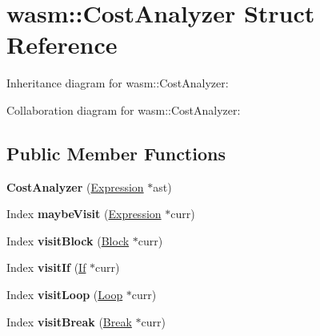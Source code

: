 \hypertarget{structwasm_1_1_cost_analyzer}{}\section{wasm\+:\+:Cost\+Analyzer Struct Reference}
\label{structwasm_1_1_cost_analyzer}


Inheritance diagram for wasm\+:\+:Cost\+Analyzer\+:


Collaboration diagram for wasm\+:\+:Cost\+Analyzer\+:
\subsection*{Public Member Functions}
\begin{DoxyCompactItemize}
\item 
\mbox{\label{structwasm_1_1_cost_analyzer_acbe33cdde382105fd6faff73ebd56bc3}} 
{\bfseries Cost\+Analyzer} (\mbox{\hyperlink{classwasm_1_1_expression}{Expression}} $\ast$ast)
\item 
\mbox{\label{structwasm_1_1_cost_analyzer_a6a0e0ae723398dc68a5b70b4667e8025}} 
Index {\bfseries maybe\+Visit} (\mbox{\hyperlink{classwasm_1_1_expression}{Expression}} $\ast$curr)
\item 
\mbox{\label{structwasm_1_1_cost_analyzer_ac576fca08a8882504945fc85fe2d72d6}} 
Index {\bfseries visit\+Block} (\mbox{\hyperlink{classwasm_1_1_block}{Block}} $\ast$curr)
\item 
\mbox{\label{structwasm_1_1_cost_analyzer_a7b62c2cab0cd46bb444e09164f72f825}} 
Index {\bfseries visit\+If} (\mbox{\hyperlink{classwasm_1_1_if}{If}} $\ast$curr)
\item 
\mbox{\label{structwasm_1_1_cost_analyzer_af9eb6b45ca7053331137a04e67818552}} 
Index {\bfseries visit\+Loop} (\mbox{\hyperlink{classwasm_1_1_loop}{Loop}} $\ast$curr)
\item 
\mbox{\label{structwasm_1_1_cost_analyzer_a47bd4946404a5818e2b259e162200886}} 
Index {\bfseries visit\+Break} (\mbox{\hyperlink{classwasm_1_1_break}{Break}} $\ast$curr)
\item 

\end{DoxyCompactItemize}
